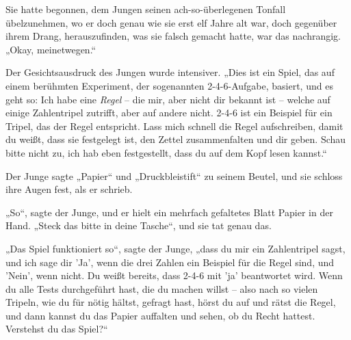 Sie hatte begonnen, dem Jungen seinen ach-so-überlegenen Tonfall übelzunehmen, wo er doch genau wie sie erst elf Jahre alt war, doch gegenüber ihrem Drang, herauszufinden, was sie falsch gemacht hatte, war das nachrangig. „Okay, meinetwegen.“

Der Gesichtsausdruck des Jungen wurde intensiver. „Dies ist ein Spiel, das auf einem berühmten Experiment, der sogenannten 2-4-6-Aufgabe, basiert, und es geht so: Ich habe eine \emph{Regel} – die mir, aber nicht dir bekannt ist – welche auf einige Zahlentripel zutrifft, aber auf andere nicht. 2-4-6 ist ein Beispiel für ein Tripel, das der Regel entspricht. Lass mich schnell die Regel aufschreiben, damit du weißt, dass sie festgelegt ist, den Zettel zusammenfalten und dir geben. Schau bitte nicht zu, ich hab eben festgestellt, dass du auf dem Kopf lesen kannst.“

Der Junge sagte „Papier“ und „Druckbleistift“ zu seinem Beutel, und sie schloss ihre Augen fest, als er schrieb.

„So“, sagte der Junge, und er hielt ein mehrfach gefaltetes Blatt Papier in der Hand. „Steck das bitte in deine Tasche“, und sie tat genau das.

„Das Spiel funktioniert so“, sagte der Junge, „dass du mir ein Zahlentripel sagst, und ich sage dir 'Ja', wenn die drei Zahlen ein Beispiel für die Regel sind, und 'Nein', wenn nicht. Du weißt bereits, dass 2-4-6 mit 'ja' beantwortet wird. Wenn du alle Tests durchgeführt hast, die du machen willst – also nach so vielen Tripeln, wie du für nötig hältst, gefragt hast, hörst du auf und rätst die Regel, und dann kannst du das Papier auffalten und sehen, ob du Recht hattest. Verstehst du das Spiel?“

